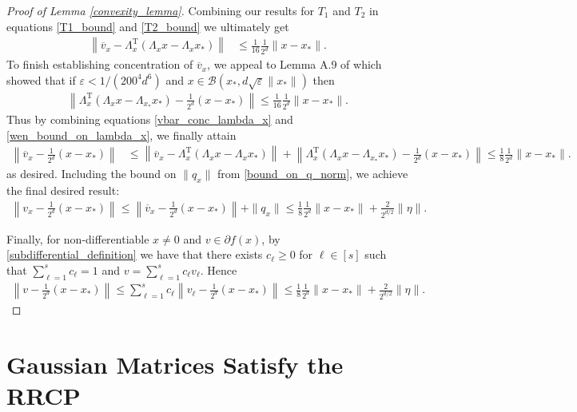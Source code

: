 \documentclass[11pt]{article}
\renewcommand{\epsilon}{\varepsilon}
\renewcommand{\top}{{\mathrm{T}}}
\theoremstyle{remark}
\begin{document}
\begin{proof}[Proof of Lemma \ref{convexity_lemma}]
Combining our results for $T_1$ and $T_2$ in equations \eqref{T1_bound} and \eqref{T2_bound} we ultimately get \begin{align}
     \left\|\overline{v}_x - \Lambda_x^\top (\Lambda_xx - \Lambda_xx_*)\right\| & \leqslant \frac{1}{16}\frac{1}{2^d}\|x-x_*\|. \label{vbar_conc_lambda_x}
\end{align} To finish establishing concentration of $\overline{v}_x$, we appeal to Lemma A.9 of \cite{Huangetal2018} which showed that if $\epsilon < 1/(200^4d^6)$ and $x \in \mathcal{B}(x_*, d\sqrt{\epsilon}\|x_*\|)$ then \begin{align}
    \left\|\Lambda_x^\top (\Lambda_x x - \Lambda_{x_*} x_*) - \frac{1}{2^d}(x-x_*) \right\| \leqslant \frac{1}{16}\frac{1}{2^d}\|x-x_*\|. \label{wen_bound_on_lambda_x}
\end{align} Thus by combining equations  \eqref{vbar_conc_lambda_x} and \eqref{wen_bound_on_lambda_x}, we finally attain \begin{align*}
    \left\|\overline{v}_x - \frac{1}{2^d}(x-x_*)\right\| & \leqslant \left\|\overline{v}_x - \Lambda_x^\top (\Lambda_xx - \Lambda_xx_*)\right\| + \left\|\Lambda_x^\top (\Lambda_x x - \Lambda_{x_*} x_*) - \frac{1}{2^d}(x-x_*) \right\|  \leqslant \frac{1}{8}\frac{1}{2^d}\|x-x_*\|.
\end{align*} as desired. Including the bound on $\|q_x\|$ from \eqref{bound_on_q_norm}, we achieve the final desired result: \begin{align*}
    \left\|v_x - \frac{1}{2^d}(x-x_*)\right\| \leqslant \left\|\overline{v}_x - \frac{1}{2^d}(x-x_*)\right\| + \|q_x\| \leqslant \frac{1}{8}\frac{1}{2^d}\|x-x_*\| + \frac{2}{2^{d/2}}\|\eta\|.
\end{align*}

Finally, for non-differentiable $x \neq 0$ and $v \in \partial f(x)$, by \eqref{subdifferential_definition} we have that there exists $c_{\ell} \geqslant 0$ for $\ell \in [s]$ such that $\sum_{\ell=1}^s c_{\ell} = 1$ and $v = \sum_{\ell=1}^s c_{\ell}v_{\ell}$. Hence \begin{align*}
    \left\|v - \frac{1}{2^d}(x-x_*)\right\| \leqslant \sum_{\ell=1}^s c_{\ell}\left\|v_{\ell} - \frac{1}{2^d}(x-x_*)\right\| \leqslant \frac{1}{8}\frac{1}{2^d}\|x-x_*\| + \frac{2}{2^{d/2}}\|\eta\|.
\end{align*}
\end{proof}

\section{Gaussian Matrices Satisfy the RRCP} \label{RRCP_section}
\end{document}
